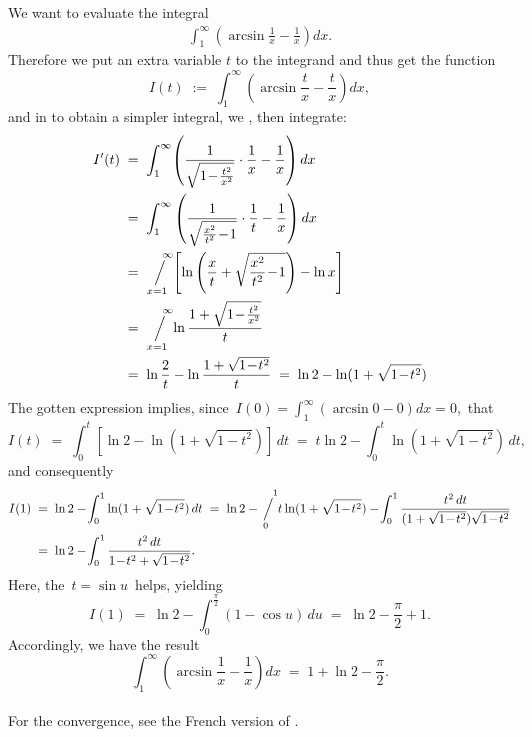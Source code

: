 \documentclass[12pt]{article}
\newcommand{\sijoitus}[2]%
{\operatornamewithlimits{\Big/}_{\!\!\!#1}^{\,#2}}
\begin{document}
We want to evaluate the integral
\begin{align}
\int_1^\infty\!\left(\arcsin\frac{1}{x}-\frac{1}{x}\right)dx.
\end{align}
Therefore we put an extra variable $t$ to the integrand and thus get the function
$$I(t) \;:=\; \int_1^\infty\!\left(\arcsin\frac{t}{x}-\frac{t}{x}\right)dx,$$
and in  to obtain a simpler integral, we , then integrate:
\begin{align*}
I'(t) & \;=\; \int_1^\infty\!\left(\frac{1}{\sqrt{1\!-\!\frac{t^2}{x^2}}}\cdot\frac{1}{x}-\frac{1}{x}\right)dx\\
& \;=\; \int_1^\infty\left(\frac{1}{\sqrt{\frac{x^2}{t^2}\!-\!1}}\cdot\frac{1}{t}-\frac{1}{x}\right)dx\\
& \;=\; \sijoitus{x=1}{\quad\infty}\!\left[\ln\left(\frac{x}{t}+\sqrt{\frac{x^2}{t^2}\!-\!1}\right)-\ln{x}\right]\\
& \;=\; \sijoitus{x=1}{\quad\infty}\!\ln\frac{1+\sqrt{1\!-\!\frac{t^2}{x^2}}}{t}\\
& \;=\; \ln\frac{2}{t}-\ln\frac{1+\sqrt{1\!-\!t^2}}{t} \;=\; \ln{2}-\ln(1+\sqrt{1\!-\!t^2})
\end{align*}
The gotten expression implies, since\, $I(0) = \int_1^\infty(\arcsin{0}-0)dx = 0$,\, that
$$I(t) \;=\; \int_0^t[\ln{2}-\ln(1+\sqrt{1\!-\!t^2})]\,dt \;=\; t\ln{2}-\int_0^t\ln(1+\sqrt{1\!-\!t^2})\,dt,$$
and consequently
\begin{align*}
I(1) & \;=\; \ln{2}-\!\int_0^1\ln(1+\sqrt{1\!-\!t^2})\,dt \;=\; 
\ln{2}-\!\sijoitus{0}{\quad1}\!t\ln(1+\sqrt{1\!-\!t^2})-\!\int_0^1\frac{t^2\,dt}{(1+\sqrt{1\!-\!t^2})\sqrt{1\!-\!t^2}}\\
& \;=\; \ln{2}-\!\int_0^1\frac{t^2\,dt}{1\!-\!t^2+\sqrt{1\!-\!t^2}}.
\end{align*}
Here, the  \,$t = \sin{u}$\, helps, yielding
$$I(1) \;=\; \ln{2}-\int_0^{\frac{\pi}{2}}\!(1-\cos{u})\,du \;=\; \ln{2}-\frac{\pi}{2}+1.$$
Accordingly, we have the result
$$\int_1^\infty\!\left(\arcsin\frac{1}{x}-\frac{1}{x}\right)dx \;=\; 1+\ln{2}-\frac{\pi}{2}.$$\\


For the convergence, see the French version of .

\end{document}
